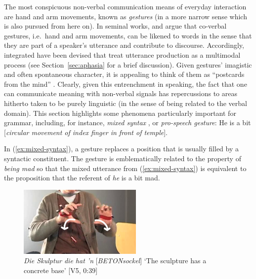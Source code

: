 \documentclass[output=paper,biblatex,babelshorthands,newtxmath,draftmode,colorlinks,citecolor=brown]{langscibook}
\begin{document}
The most conspicuous non-verbal communication means of everyday interaction are hand and arm movements, known as \emph{gestures} (in a more narrow sense which is also pursued from here on).
%
In seminal works, \citet{McNeill:1985,McNeill:1992} and \citet{Kendon:1980,Kendon:2004} argue that co-verbal gestures, i.e.\ hand and arm movements, can be likened to words in the sense that they are part of a speaker's utterance and contribute to discourse.
%
Accordingly, integrated  have been devised \citep{Kita:Ozyurek:2003,de:Ruiter:2000,Krauss:Chen:Gottesmann:2000} that treat utterance production as a multimodal process (see Section~\ref{sec:aphasia} for a brief discussion).
%
Given gestures' imagistic and often spontaneous character, it is appealing to think of them as \enquote{postcards from the mind} \citep[21]{de:Ruiter:2007:a}.
%
Clearly, given this entrenchment in speaking, the fact that one can communicate meaning with non-verbal signals has repercussions to areas hitherto taken to be purely linguistic (in the sense of being related to the verbal domain).
%
This section highlights some phenomena particularly important for grammar, including, for instance,  \emph{mixed syntax} \citep{Slama-Cazacu:1976}, or \emph{pro-speech gesture}:
%
\ea \label{ex:mixed-syntax}
He is a bit [\textit{circular movement of index finger in front of temple}].
\z

\noindent
In (\ref{ex:mixed-syntax}), a gesture replaces a position that is usually filled by a syntactic constituent.
%
The gesture is emblematically related to the property of \textit{being mad} so that the mixed
utterance from (\ref{ex:mixed-syntax}) is equivalent to the proposition that the referent of
\textit{he} is a bit mad.
\newpage

\begin{figure}
  \centering
  \includegraphics[width=6cm]{figures/Betonsockel-paths}
  \caption[Sculpture]{\textit{Die Skulptur die hat 'n} [\textit{BETONsockel}] \enquote*{The sculpture has a concrete base} [V5, 0:39]}
  \label{fig:betonsockel}
\end{figure}
\end{document}
